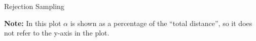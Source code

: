 \begin{vbframe}{Rejection Sampling}

\vspace*{-0.3cm}
\begin{footnotesize}
\textbf{Note:} In this plot $\alpha$ is shown as a percentage of the \enquote{total distance}, so it does not refer to the y-axis in the plot.
\end{footnotesize}

\framebreak

\begin{algorithm}[H]
  \caption{Rejection Sampling}
  \begin{algorithmic}[1]
    \Else
    \EndIf
  \EndWhile
  \end{algorithmic}
\end{algorithm}

\end{vbframe}


